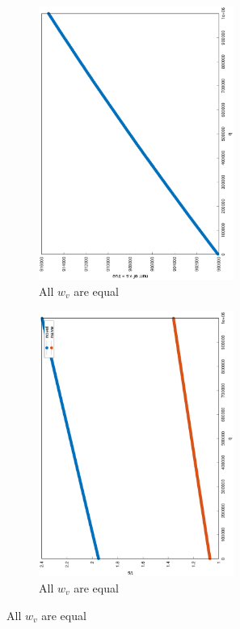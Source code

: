 \documentclass[12pt]{report}
\begin{document}
\begin{figure}
\centering
\begin{subfigure}{0.35\textwidth}
	\includegraphics[width=0.7\textwidth,angle=-90]{graph/ba_coverage_1000000_10_0.1.eps}
	\caption{All $ w_v $ are equal}
\end{subfigure}
\begin{subfigure}{0.35\textwidth}
	\includegraphics[width=0.7\textwidth,angle=-90]{graph/ba_q_1000000_10_0.1.eps}
	\caption{All $ w_v $ are equal}
\end{subfigure}


\end{figure}
\end{document}
